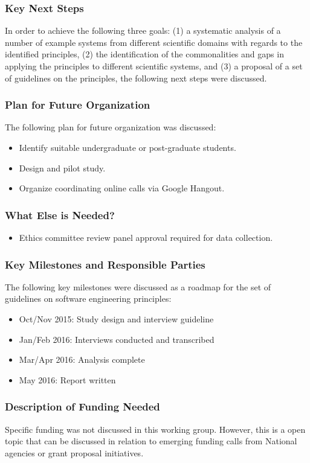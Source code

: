 \subsubsection{Key Next Steps}

In order to achieve the following three goals: (1) a systematic analysis of a number of example systems from
different scientific domains with regards to the identified principles, (2) the
identification of the commonalities and gaps in applying the principles to different
scientific systems, and (3) a proposal of a set of guidelines on the
principles, the following next steps were discussed.

\subsubsection{Plan for Future Organization}

The following plan for future organization was discussed:
\begin{itemize}
\item Identify suitable undergraduate or post-graduate students.
\item Design and pilot study.
\item Organize coordinating online calls via Google Hangout.
\end{itemize}

\subsubsection{What Else is Needed?}

\begin{itemize}
\item Ethics committee review panel approval required for data collection.
\end{itemize}

\subsubsection{Key Milestones and Responsible Parties}

The following key milestones were discussed as a roadmap for the set of
guidelines on software engineering principles:
\begin{itemize}
\item Oct/Nov 2015: Study design and interview guideline
\item Jan/Feb 2016: Interviews conducted and transcribed
\item Mar/Apr 2016: Analysis complete
\item May 2016: Report written
\end{itemize}

\subsubsection{Description of Funding Needed}

Specific funding was not discussed in this working group. However, this is a
open topic that can be discussed in relation to emerging funding calls from
National agencies or grant proposal initiatives.
